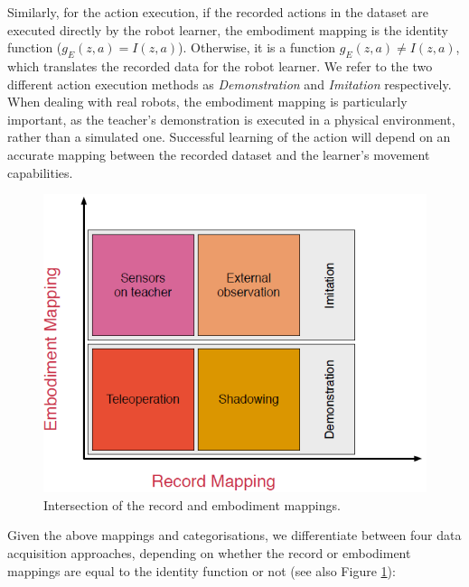 Similarly, for the action execution, if the recorded actions in the dataset are executed directly by the robot learner, the embodiment mapping is the identity function ($g_E(z,a) = I(z,a)$).
 Otherwise, it is a function $g_E(z,a) \neq I(z,a)$, which translates the recorded data for the robot learner.
  We refer to the two different action execution methods as \textit{Demonstration} and \textit{Imitation} respectively.
When dealing with real robots, the embodiment mapping is particularly important, as the teacher's demonstration is executed in a physical environment, rather than a simulated one.
 Successful learning of the action will depend on an accurate mapping between the recorded dataset and the learner's movement capabilities.
  \begin{figure}[!h]
    \centering
    \includegraphics[scale=0.5]{figures/Gathering}
    \caption{Intersection of the record and embodiment mappings.}
    \label{fig:Gathering demonstrations}
  \end{figure}

Given the above mappings and categorisations, we differentiate between four data acquisition approaches, depending on whether the record or embodiment mappings are equal to the identity function or not (see also Figure \ref{fig:Gathering demonstrations}):

